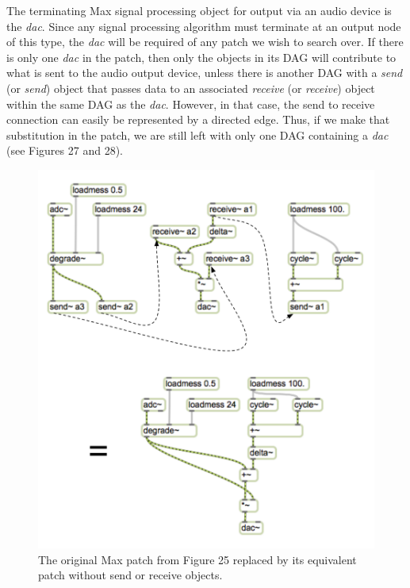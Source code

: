 \documentclass[12pt]{report} 	%
\numberwithin{figure}{chapter}
\numberwithin{table}{chapter}
\numberwithin{equation}{chapter}
\begin{document}
\begin{flushleft}
The terminating Max signal processing object for output via an audio device is the \textit{dac\texttildelow{}}. Since any signal processing algorithm must terminate at an output node of this type, the \textit{dac\texttildelow{}} will be required of any patch we wish to search over. If there is only one \textit{dac\texttildelow{}} in the patch, then only the objects in its DAG will contribute to what is sent to the audio output device, unless there is another DAG with a \textit{send\texttildelow{}} (or \textit{send}) object that passes data to an associated \textit{receive\texttildelow{}} (or \textit{receive}) object within the same DAG as the \textit{dac\texttildelow{}}. However, in that case, the send to receive connection can easily be represented by a directed edge. Thus, if we make that substitution in the patch, we are still left with only one DAG containing a \textit{dac\texttildelow{}} (see Figures 27 and 28).
\begin{figure}[h!]
\vspace{15pt}
\begin{center}
\includegraphics[scale=0.75]{MaxDAGsSendReceive1}
\caption[Removing send\texttildelow{} and receive\texttildelow{} objects]{The original Max patch from Figure 25 replaced by its equivalent patch without send\texttildelow{} or receive\texttildelow{} objects.}
\end{center}
\vspace{15pt}
\end{figure}


\end{flushleft}
\end{document}
